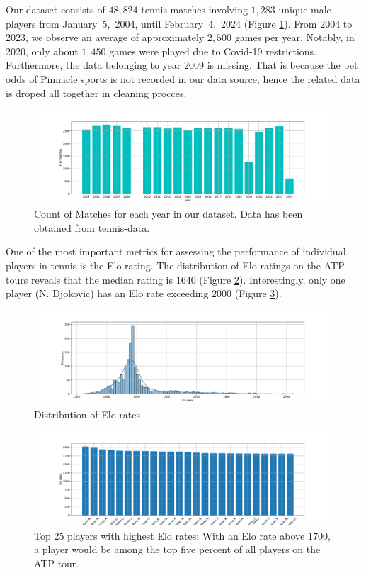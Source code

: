 \documentclass[preprint,aps,nofootinbib,a4paper,superscriptaddress,longbibliography,amsfonts,amssymb,amsmath,titlepage]{revtex4-2}
\begin{document}
Our dataset consists of $48,824$ tennis matches involving $1,283$ unique male players from January~5,~2004, until February~4,~2024 (Figure \ref{match-count-year-dist}). From 2004 to 2023, we observe an average of approximately $2,500$ games per year. Notably, in 2020, only about $1,450$ games were played due to Covid-19 restrictions. Furthermore, the data belonging to year 2009 is missing. That is because the bet odds of Pinnacle sports is not recorded in our data source, hence the related data is droped all together in cleaning procces.
%
\begin{figure}[h]
\includegraphics[width=\textwidth]{pictures/match-count-year-dist.pdf}
\caption{Count of Matches for each year in our dataset. Data has been obtained from \href{http://tennis-data.co.uk/}{tennis-data}.}
\label{match-count-year-dist}
\end{figure}
%
One of the most important metrics for assessing the performance of individual players in tennis is the Elo rating. The distribution of Elo ratings on the ATP tours reveals that the median rating is $1640$ (Figure \ref{elo-rates-dist}). Interestingly, only one player (N. Djokovic) has an Elo rate exceeding $2000$ (Figure \ref{top-25-elo-rates}).
%
\begin{figure}[h]
\includegraphics[width=\textwidth]{pictures/elo-rates-dist.pdf}
\caption{Distribution of Elo rates}
\label{elo-rates-dist}
\end{figure}
%
%
\begin{figure}[h]
\includegraphics[width=\textwidth]{pictures/top-25-elo-rates.pdf}
\caption{Top 25 players with highest Elo rates: With an Elo rate above $1700$, a player would be among the top five percent of all players on the ATP tour.}
\label{top-25-elo-rates}
\end{figure}
\end{document}
